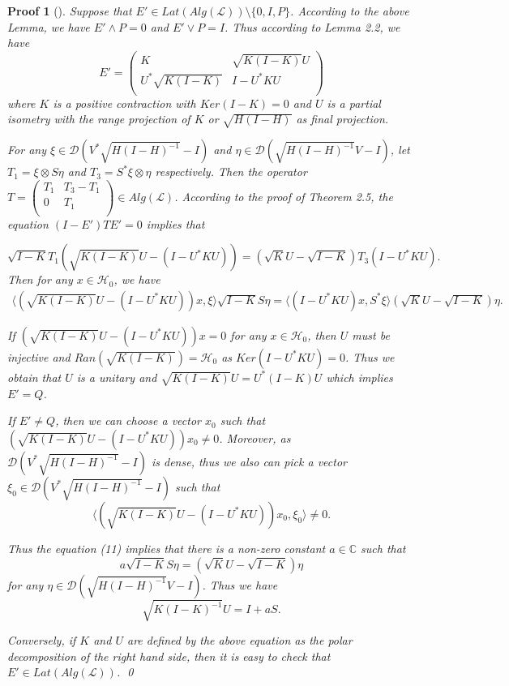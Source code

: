 \documentclass{jaums}
\theoremstyle{thmit} %
\theoremstyle{thmrm} %
\newtheorem*{oldproof}{Proof}
\renewenvironment{proof}[1][{}]{\begin{oldproof}[#1]}{\qed\end{oldproof}}
\begin{document}
\begin{proof} Suppose that $E'\in Lat(Alg(\mathcal{L}))\setminus\{0,I,P\}$.
According to the above Lemma, we have
$E'\wedge P=0$ and $E'\vee P=I$. Thus according to Lemma 2.2,
we have
$$E'=\left(
\begin{array}{cc} K & \sqrt{K(I-K)}U  \\
 U^{*}\sqrt{K(I-K)} & I-U^{*}KU     \\
 \end{array}
 \right)$$
where $K$ is a positive contraction with $Ker(I-K)=0$ and $U$ is a partial
isometry with the range projection of $K$ or $\sqrt{H(I-H)}$
 as final projection.

 For any $\xi\in\mathcal{D}(V^*\sqrt{H(I-H)^{-1}}-I)$ and
$\eta\in\mathcal{D}(\sqrt{H(I-H)^{-1}}V-I)$,
 let $T_1=\xi\otimes S\eta$
and $T_3=S^{*}\xi\otimes\eta$ respectively. Then the operator $T=\left(
      \begin{array}{cc}
        T_1   &    T_3-T_1  \\
        0     &    T_1      \\
      \end{array}
    \right)\in Alg(\mathcal{L})$. According to the proof of Theorem 2.5, the
equation $(I-E')TE'=0$ implies that
       
$$\sqrt{I-K}T_1(\sqrt{K(I-K)}U-(I-U^{*}KU))=(\sqrt{K}U-\sqrt{I-K})T_3(I-U^{*}
KU).$$
   Then for any $x\in\mathcal{H}_0$, we have
   \begin{align}
   \langle(\sqrt{K(I-K)}U-(I-U^{*}KU))x,\xi\rangle \sqrt{I-K}S\eta=\langle
(I-U^{*}KU)x,S^{*}\xi\rangle(\sqrt{K}U-\sqrt{I-K})\eta.
   \end{align}


If $(\sqrt{K(I-K)}U-(I-U^{*}KU))x=0$ for any $x\in\mathcal{H}_0$, then $U$ must
be injective and $Ran(\sqrt{K(I-K)})=\mathcal{H}_0$
as $Ker(I-U^*KU)=0$. Thus we obtain that $U$ is a unitary and
$\sqrt{K(I-K)}U=U^*(I-K)U$ which implies $E'=Q$.

If $E'\neq Q$, then we can choose a vector $x_0$
   such that $(\sqrt{K(I-K)}U-(I-U^{*}KU))x_0\neq0$. Moreover, as
$\mathcal{D}(V^*\sqrt{H(I-H)^{-1}}-I)$ is dense, thus we also can pick a vector
   $\xi_0\in\mathcal{D}(V^*\sqrt{H(I-H)^{-1}}-I)$ such that
   $$\langle(\sqrt{K(I-K)}U-(I-U^{*}KU))x_0,\xi_0\rangle\neq0.$$

   Thus the equation (11) implies that there is a non-zero constant
$a\in\mathbb{C}$ such that
   $$a\sqrt{I-K}S\eta=(\sqrt{K}U-\sqrt{I-K})\eta$$
   for any
   $\eta\in\mathcal{D}(\sqrt{H(I-H)^{-1}}V-I)$. Thus we have
   $$\sqrt{K(I-K)^{-1}}U=I+aS.$$

   Conversely, if $K$ and $U$ are defined by the above equation as the polar
decomposition of the right hand side, then it is easy to check that
   $E'\in Lat(Alg(\mathcal{L}))$.
\end{proof}
\end{document}
